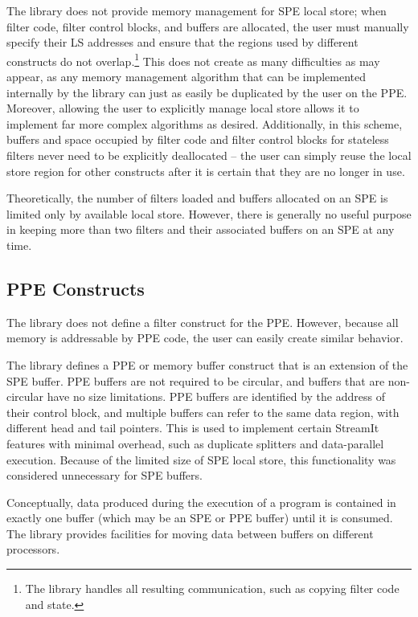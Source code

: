 The library does not provide memory management for SPE local store; when filter code, filter control blocks, and buffers are allocated, the user must manually specify their LS addresses and ensure that the regions used by different constructs do not overlap.\footnote{The library handles all resulting communication, such as copying filter code and state.} This does not create as many difficulties as may appear, as any memory management algorithm that can be implemented internally by the library can just as easily be duplicated by the user on the PPE. Moreover, allowing the user to explicitly manage local store allows it to implement far more complex algorithms as desired. Additionally, in this scheme, buffers and space occupied by filter code and filter control blocks for stateless filters never need to be explicitly deallocated -- the user can simply reuse the local store region for other constructs after it is certain that they are no longer in use.

Theoretically, the number of filters loaded and buffers allocated on an SPE is limited only by available local store. However, there is generally no useful purpose in keeping more than two filters and their associated buffers on an SPE at any time.

\subsection{PPE Constructs}

The library does not define a filter construct for the PPE. However, because all memory is addressable by PPE code, the user can easily create similar behavior.

The library defines a PPE or memory buffer construct that is an extension of the SPE buffer. PPE buffers are not required to be circular, and buffers that are non-circular have no size limitations. PPE buffers are identified by the address of their control block, and multiple buffers can refer to the same data region, with different head and tail pointers. This is used to implement certain StreamIt features with minimal overhead, such as duplicate splitters and data-parallel execution. Because of the limited size of SPE local store, this functionality was considered unnecessary for SPE buffers.

Conceptually, data produced during the execution of a program is contained in exactly one buffer (which may be an SPE or PPE buffer) until it is consumed. The library provides facilities for moving data between buffers on different processors.
 
